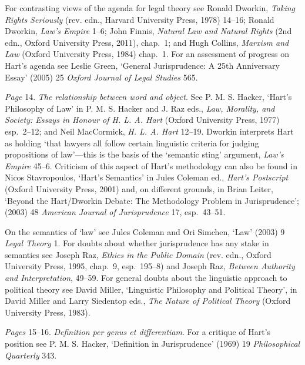 \documentclass[12pt,oneside]{book}  %
\begin{document}
For contrasting views of the agenda for legal theory see Ronald Dworkin,
\emph{Taking Rights Seriously} (rev. edn., Harvard University Press,
1978) 14--16; Ronald Dworkin, \emph{Law's Empire} 1--6; John Finnis,
\emph{Natural Law and Natural Rights} (2nd edn., Oxford University
Press, 2011), chap.~1; and Hugh Collins, \emph{Marxism and Law} (Oxford
University Press, 1984) chap.~1. For an assessment of progress on Hart's
agenda see Leslie Green, `General Jurisprudence: A 25th Anniversary
Essay' (2005) 25 \emph{Oxford Journal of Legal Studies} 565.

\emph{Page} 14. \emph{The relationship between word and object}. See P.
M. S. Hacker, `Hart's Philosophy of Law' in P. M. S. Hacker and J. Raz
eds., \emph{Law, Morality, and Society: Essays in Honour of H. L. A.
Hart} (Oxford University Press, 1977) esp.~2--12; and Neil MacCormick,
\emph{H. L. A. Hart} 12--19. Dworkin interprets Hart as holding `that
lawyers all follow certain linguistic criteria for judging propositions
of law'---this is the basis of the `semantic sting' argument,
\emph{Law's Empire} 45--6. Criticism of this aspect of Hart's
methodology can also be found in Nicos Stavropoulos, `Hart's Semantics'
in Jules Coleman ed., \emph{Hart's Postscript} (Oxford University Press,
2001) and, on different grounds, in Brian Leiter, `Beyond the
Hart/Dworkin Debate: The Methodology Problem in Jurisprudence'; (2003)
48 \emph{American Journal of Jurisprudence} 17, esp.~43--51.

On the semantics of `law' see Jules Coleman and Ori Simchen, `Law'
(2003) 9 \emph{Legal Theory} 1. For doubts about whether jurisprudence
has any stake in semantics see Joseph Raz, \emph{Ethics in the Public
Domain} (rev. edn., Oxford University Press, 1995, chap.~9, esp.~195--8)
and Joseph Raz, \emph{Between Authority and Interpretation}, 49--59. For
general doubts about the linguistic approach to political theory see
David Miller, `Linguistic Philosophy and Political Theory', in David
Miller and Larry Siedentop eds., \emph{The Nature of Political Theory}
(Oxford University Press, 1983).

\emph{Pages} 15--16. \emph{Definition per genus et differentiam}. For a
critique of Hart's position see P. M. S. Hacker, `Definition in
Jurisprudence' (1969) 19 \emph{Philosophical Quarterly} 343.
\end{document}
